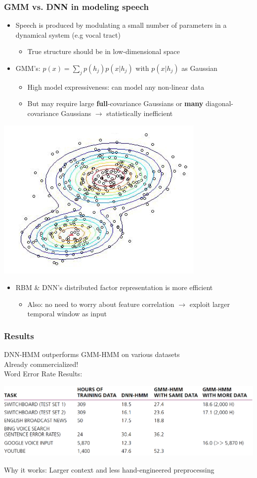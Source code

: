 \documentclass{beamer}
\newcommand{\bi}{\begin{itemize}}
\newcommand{\ei}{\end{itemize}}
\begin{document}
\begin{frame}
\frametitle{GMM vs. DNN in modeling speech}
\bi
\item Speech is produced by modulating a small number of parameters in a dynamical system (e.g vocal tract)
	\bi
	\item True structure should be in low-dimensional space
	\ei
\pause
\item GMM's: $p(x)=\sum_j p(h_j)p(x|h_j)$ with $p(x|h_j)$ as Gaussian
	\bi
	\item High model expressiveness: can model any non-linear data
	\item But may require large {\bf full}-covariance Gaussians or {\bf many} diagonal-covariance Gaussians $\rightarrow$ statistically inefficient
	\ei
\ei
\centerline{\includegraphics[scale=0.3]{figs/gaussianmixture}}
\pause
\bi
\item RBM \& DNN's distributed factor representation is more efficient 
	\bi
	\item Also: no need to worry about feature correlation $\rightarrow$ exploit larger temporal window as input
	\ei
\ei

\end{frame}


\begin{frame}
\frametitle{Results}
DNN-HMM outperforms GMM-HMM on various datasets\\
Already commercialized!\\[1cm]

Word Error Rate Results:

\centerline{\includegraphics[scale=0.18]{figs/hinton12wer}}

Why it works: Larger context and less hand-engineered preprocessing\\

\end{frame}
\end{document}
